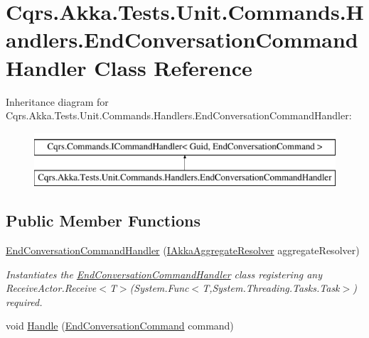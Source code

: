\hypertarget{classCqrs_1_1Akka_1_1Tests_1_1Unit_1_1Commands_1_1Handlers_1_1EndConversationCommandHandler}{}\section{Cqrs.\+Akka.\+Tests.\+Unit.\+Commands.\+Handlers.\+End\+Conversation\+Command\+Handler Class Reference}
\label{classCqrs_1_1Akka_1_1Tests_1_1Unit_1_1Commands_1_1Handlers_1_1EndConversationCommandHandler}
Inheritance diagram for Cqrs.\+Akka.\+Tests.\+Unit.\+Commands.\+Handlers.\+End\+Conversation\+Command\+Handler\+:\begin{figure}[H]
\begin{center}
\leavevmode
\includegraphics[height=2.000000cm]{classCqrs_1_1Akka_1_1Tests_1_1Unit_1_1Commands_1_1Handlers_1_1EndConversationCommandHandler}
\end{center}
\end{figure}
\subsection*{Public Member Functions}
\begin{DoxyCompactItemize}
\item 
\hyperlink{classCqrs_1_1Akka_1_1Tests_1_1Unit_1_1Commands_1_1Handlers_1_1EndConversationCommandHandler_aaf3680b69f6cbad95722194c4c16cd1f}{End\+Conversation\+Command\+Handler} (\hyperlink{interfaceCqrs_1_1Akka_1_1Domain_1_1IAkkaAggregateResolver}{I\+Akka\+Aggregate\+Resolver} aggregate\+Resolver)
\begin{DoxyCompactList}\small\item\em Instantiates the \hyperlink{classCqrs_1_1Akka_1_1Tests_1_1Unit_1_1Commands_1_1Handlers_1_1EndConversationCommandHandler}{End\+Conversation\+Command\+Handler} class registering any Receive\+Actor.\+Receive$<$\+T$>$(\+System.\+Func$<$\+T,\+System.\+Threading.\+Tasks.\+Task$>$) required. \end{DoxyCompactList}\item 
void \hyperlink{classCqrs_1_1Akka_1_1Tests_1_1Unit_1_1Commands_1_1Handlers_1_1EndConversationCommandHandler_a45cc1e01d68fb5b241c9e46b333a149e}{Handle} (\hyperlink{classCqrs_1_1Akka_1_1Tests_1_1Unit_1_1Commands_1_1EndConversationCommand}{End\+Conversation\+Command} command)
\end{DoxyCompactItemize}

